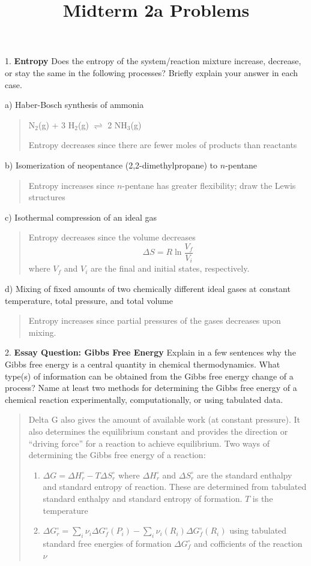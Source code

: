 \documentclass[11pt]{article}
\title{\textbf{Midterm 2a Problems}}
\newcommand{\brian}[1]{
  {\begin{quote}
      \color{blue} #1
  \end{quote}}
}
\begin{document}
\maketitle

1. \textbf{Entropy} Does the entropy of the system/reaction mixture increase,
decrease, or stay the same in the following processes? Briefly explain your
answer in each case.

a) Haber-Bosch synthesis of ammonia

\brian{N$_2$(g) + 3 H$_2$(g) $\rightleftharpoons$ 2 NH$_3$(g)

  Entropy decreases since there are fewer moles of products than reactants
}

b) Isomerization of neopentance (2,2-dimethylpropane) to $n$-pentane

\brian{Entropy increases since $n$-pentane has greater flexibility; draw the
  Lewis structures
}

c) Isothermal compression of an ideal gas

\brian{Entropy decreases since the volume decreases
  \begin{equation*}
    \Delta S = R\ln\frac{V_f}{V_i}
  \end{equation*}
  where $V_f$ and $V_i$ are the final and initial states, respectively.
}

d) Mixing of fixed amounts of two chemically different ideal gases at constant temperature,
total pressure, and total volume

\brian{Entropy increases since partial pressures of the gases decreases upon mixing.}

2. \textbf{Essay Question: Gibbs Free Energy} Explain in a few sentences why the Gibbs
free energy is a central quantity in chemical thermodynamics. What type(s) of information
can be obtained from the Gibbs free energy change of a process? Name at least two methods
for determining the Gibbs free energy of a chemical reaction experimentally, computationally,
or using tabulated data.

\brian{Delta G also gives the amount of available work (at constant pressure).
  It also determines the equilibrium constant and provides the direction or ``driving force''
  for a reaction to achieve equilibrium. Two ways of determining the Gibbs free energy of a reaction:
  \begin{enumerate}
  \item $\Delta G = \Delta H^\circ_r - T\Delta S^\circ_r$ where $\Delta H^\circ_r$ and $\Delta S^\circ_r$
    are the standard enthalpy and standard entropy of reaction. These are determined from tabulated
    standard enthalpy and standard entropy of formation. $T$ is the temperature
  \item $\Delta G^\circ_r = \sum_i \nu_i\Delta G^\circ_f(P_i)-\sum_i\nu_i(R_i)\Delta G^\circ_f(R_i)$
    using tabulated standard free energies of formation $\Delta G^\circ_f$ and cofficients of the reaction
    $\nu$
  \end{enumerate}
}
\end{document}
